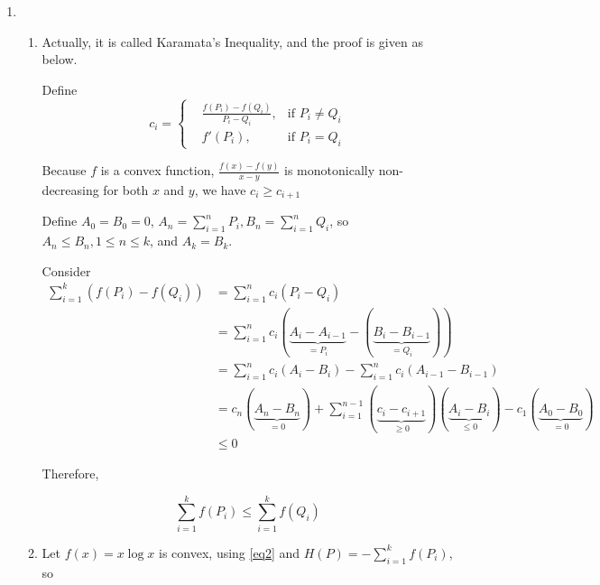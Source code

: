\documentclass[a4paper]{article}
\begin{document}
\begin{enumerate}
    \item \begin{enumerate}
      \item Actually, it is called Karamata's Inequality, and the proof is given as below. 

      Define 
      \begin{equation}
        c_{i} = \left\{\begin{aligned}
          &\frac {f(P_i)-f(Q_i)}{P_i - Q_i}, &\text{if  }  P_i\neq Q_i\\
          &  f'(P_i), &\text{if  } P_i = Q_i
        \end{aligned}\right.
      \end{equation}
      
      Because $f$ is a convex function, $\frac {f(x)-f(y)}{x-y}$ is monotonically non-decreasing for both $x$ and $y$, we have $c_i \geqslant c_{i+1}$

      Define $A_0 = B_0 = 0$, $A_n = \sum_{i=1}^{n} P_i, B_n = \sum_{i=1}^n Q_i$, so $A_n \leqslant B_n, 1\leqslant n \leqslant k $, and $A_k = B_k$.

      Consider
      \begin{equation}
        \begin{aligned} \sum_{i=1}^{k}\left(f\left(P_{i}\right)-f\left(Q_{i}\right)\right) &=\sum_{i=1}^{n} c_{i}\left(P_{i}-Q_{i}\right) \\ 
          &=\sum_{i=1}^{n} c_{i}(\underbrace{A_{i}-A_{i-1}}_{=P_{i}}-(\underbrace{B_{i}-B_{i-1}}_{=Q_{i}})) \\
          &=\sum_{i=1}^{n} c_{i}\left(A_{i}-B_{i}\right)-\sum_{i=1}^{n} c_{i}\left(A_{i-1}-B_{i-1}\right) 
          \\ &=c_{n}(\underbrace{A_{n}-B_{n}}_{=0})+\sum_{i=1}^{n-1}(\underbrace{c_{i}-c_{i+1}}_{\geqslant 0})(\underbrace{A_{i}-B_{i}}_{\leqslant 0})-c_{1}(\underbrace{A_{0}-B_{0}}_{=0}) \\ & \leqslant 0 \end{aligned}
      \end{equation}

      Therefore,

      \begin{equation}\label{eq2}
        \sum_{i=1}^{k} f\left(P_{i}\right) \leq \sum_{i=1}^{k} f\left(Q_{i}\right)
      \end{equation}

      \item Let $f(x) = x\log x$ is convex, using \ref{eq2} and $H(P) = -\sum_{i=1}^{k} f\left(P_{i}\right)$, so 
      

\end{enumerate}
\end{enumerate}
\end{document}
